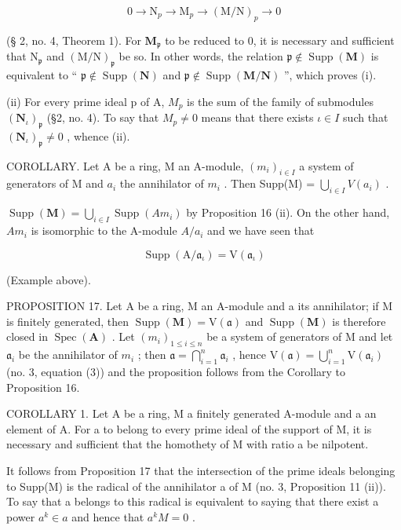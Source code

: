 \[
0 \rightarrow \mathrm{N} _ {p} \rightarrow \mathrm{M} _ {p} \rightarrow (\mathrm{M} / \mathrm{N}) _ {p} \rightarrow 0
\]

(§ 2, no. 4, Theorem 1). For \(\mathbf{M}_{\mathfrak{p}}\) to be reduced to 0, it is necessary and sufficient that \(\mathrm{N}_{\mathfrak{p}}\) and \((\mathrm{M} / \mathrm{N})_{\mathfrak{p}}\) be so. In other words, the relation \(\mathfrak{p} \notin \operatorname{Supp}(\mathbf{M})\) is equivalent to `` \(\mathfrak{p} \notin \operatorname{Supp}(\mathbf{N})\) and \(\mathfrak{p} \notin \operatorname{Supp}(\mathbf{M} / \mathbf{N})\) '', which proves (i).

(ii) For every prime ideal p of A, \(M_{p}\) is the sum of the family of submodules \((\mathbf{N}_{\iota})_{\mathfrak{p}}\) (§2, no. 4). To say that \(M_{p} \neq 0\) means that there exists \(\iota \in I\) such that \((\mathbf{N}_{\iota})_{\mathfrak{p}} \neq 0\) , whence (ii).

COROLLARY. Let A be a ring, M an A-module, \((m_{i})_{i\in I}\) a system of generators of M and \(a_{i}\) the annihilator of \(m_{i}\) . Then Supp(M) = \(\bigcup_{i\in I} V(a_{i})\) .

\(\operatorname{Supp}(\mathbf{M}) = \bigcup_{i \in I} \operatorname{Supp}(Am_i)\) by Proposition 16 (ii). On the other hand, \(Am_i\) is isomorphic to the A-module \(A/a_i\) and we have seen that

\[
\operatorname{Supp} (\mathrm{A} / \mathfrak {a} _ {\iota}) = \mathrm{V} (\mathfrak {a} _ {\iota})
\]

(Example above).

PROPOSITION 17. Let A be a ring, M an A-module and a its annihilator; if M is finitely generated, then \(\operatorname{Supp}(\mathbf{M}) = \mathrm{V}(\mathfrak{a})\) and \(\operatorname{Supp}(\mathbf{M})\) is therefore closed in \(\operatorname{Spec}(\mathbf{A})\) . Let \((m_i)_{1 \leqslant i \leqslant n}\) be a system of generators of M and let \(\mathfrak{a}_i\) be the annihilator of \(m_i\) ; then \(\mathfrak{a} = \bigcap_{i=1}^{n} \mathfrak{a}_i\) , hence \(\mathrm{V}(\mathfrak{a}) = \bigcup_{i=1}^{n} \mathrm{V}(\mathfrak{a}_i)\) (no. 3, equation (3)) and the proposition follows from the Corollary to Proposition 16.

COROLLARY 1. Let A be a ring, M a finitely generated A-module and a an element of A. For a to belong to every prime ideal of the support of M, it is necessary and sufficient that the homothety of M with ratio a be nilpotent.

It follows from Proposition 17 that the intersection of the prime ideals belonging to Supp(M) is the radical of the annihilator a of M (no. 3, Proposition 11 (ii)). To say that a belongs to this radical is equivalent to saying that there exist a power \(a^{k} \in a\) and hence that \(a^{k}M = 0\) .

